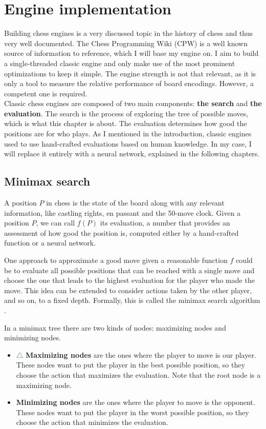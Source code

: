 \section{Engine implementation}

Building chess engines is a very discussed topic in the history of chess and thus very well documented. The Chess Programming Wiki (CPW) \cite{cpw} is a well known source of information to reference, which I will base my engine on. I aim to build a single-threaded classic engine and only make use of the most prominent optimizations to keep it simple. The engine strength is not that relevant, as it is only a tool to measure the relative performance of board encodings. However, a competent one is required. \\

Classic chess engines are composed of two main components: \textbf{the search} and \textbf{the evaluation}. The search is the process of exploring the tree of possible moves, which is what this chapter is about. The evaluation determines how good the positions are for who plays. As I mentioned in the introduction, classic engines used to use hand-crafted evaluations based on human knowledge. In my case, I will replace it entirely with a neural network, explained in the following chapters.

\subsection{Minimax search}

A position $P$ in chess is the state of the board along with any relevant information, like castling rights, en passant and the 50-move clock. Given a position $P$, we can call $f(P)$ its evaluation, a number that provides an assessment of how good the position is, computed either by a hand-crafted function or a neural network.

One approach to approximate a good move given a reasonable function $f$ could be to evaluate all possible positions that can be reached with a single move and choose the one that leads to the highest evaluation for the player who made the move. This idea can be extended to consider actions taken by the other player, and so on, to a fixed depth. Formally, this is called the minimax search algorithm \cite{minimax-survey:1995}.

In a minimax tree there are two kinds of nodes: maximizing nodes and minimizing nodes. 

\begin{itemize}
\item \textcolor{ForestGreen}{$\triangle$} \textbf{Maximizing nodes} are the ones where the player to move is our player. These nodes want to put the player in the best possible position, so they choose the action that maximizes the evaluation. Note that the root node is a maximizing node.
\item \textcolor{red}{} \textbf{Minimizing nodes} are the ones where the player to move is the opponent. These nodes want to put the player in the worst possible position, so they choose the action that minimizes the evaluation.
\end{itemize}


